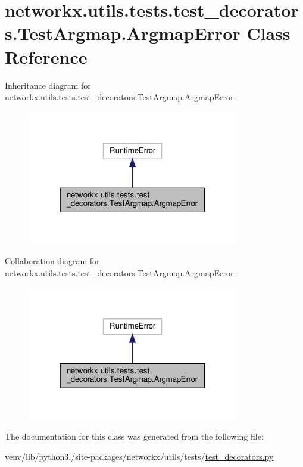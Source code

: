 \hypertarget{classnetworkx_1_1utils_1_1tests_1_1test__decorators_1_1TestArgmap_1_1ArgmapError}{}\section{networkx.\+utils.\+tests.\+test\+\_\+decorators.\+Test\+Argmap.\+Argmap\+Error Class Reference}
\label{classnetworkx_1_1utils_1_1tests_1_1test__decorators_1_1TestArgmap_1_1ArgmapError}


Inheritance diagram for networkx.\+utils.\+tests.\+test\+\_\+decorators.\+Test\+Argmap.\+Argmap\+Error\+:
\nopagebreak
\begin{figure}[H]
\begin{center}
\leavevmode
\includegraphics[width=262pt]{classnetworkx_1_1utils_1_1tests_1_1test__decorators_1_1TestArgmap_1_1ArgmapError__inherit__graph}
\end{center}
\end{figure}


Collaboration diagram for networkx.\+utils.\+tests.\+test\+\_\+decorators.\+Test\+Argmap.\+Argmap\+Error\+:
\nopagebreak
\begin{figure}[H]
\begin{center}
\leavevmode
\includegraphics[width=262pt]{classnetworkx_1_1utils_1_1tests_1_1test__decorators_1_1TestArgmap_1_1ArgmapError__coll__graph}
\end{center}
\end{figure}


The documentation for this class was generated from the following file\+:\begin{DoxyCompactItemize}
\item 
venv/lib/python3./site-\/packages/networkx/utils/tests/\hyperlink{test__decorators_8py}{test\+\_\+decorators.\+py}\end{DoxyCompactItemize}
